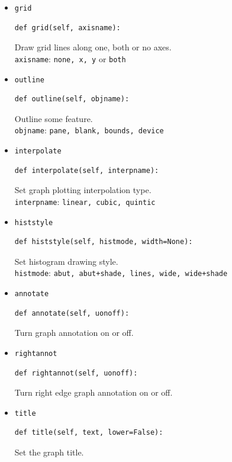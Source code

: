 \documentclass[a4paper,twoside,11pt]{article}
\begin{document}
\begin{itemize}
\item{\texttt{grid}}\\
\begin{lstlisting}
def grid(self, axisname):
\end{lstlisting}
  Draw grid lines along one, both or no axes.\\
  \texttt{axisname}: \texttt{none, x, y} or \texttt{both}

\item{\texttt{outline}}\\
\begin{lstlisting}
def outline(self, objname):
\end{lstlisting}
  Outline some feature.\\
  \texttt{objname}: \texttt{pane, blank, bounds, device}

\item{\texttt{interpolate}}\\
\begin{lstlisting}
def interpolate(self, interpname):
\end{lstlisting}
  Set graph plotting interpolation type.\\
  \texttt{interpname}: \texttt{linear, cubic, quintic}

\item{\texttt{histstyle}}\\
\begin{lstlisting}
def histstyle(self, histmode, width=None):
\end{lstlisting}
  Set histogram drawing style.\\
  \texttt{histmode}: \texttt{abut, abut+shade, lines, wide, wide+shade}

\item{\texttt{annotate}}\\
\begin{lstlisting}
def annotate(self, uonoff):
\end{lstlisting}
Turn graph annotation on or off.

\item{\texttt{rightannot}}\\
\begin{lstlisting}
def rightannot(self, uonoff):
\end{lstlisting}
Turn right edge graph annotation on or off.

\item{\texttt{title}}\\
\begin{lstlisting}
def title(self, text, lower=False):
\end{lstlisting}
Set the graph title.


\end{itemize}
\end{document}
